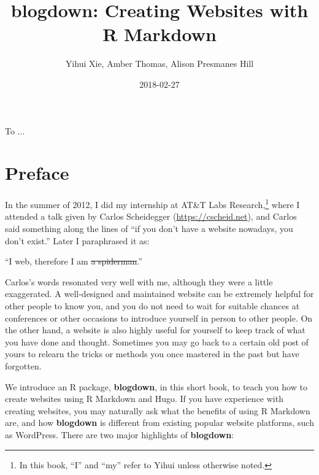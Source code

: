 \documentclass[12pt,]{krantz}
\title{blogdown: Creating Websites with R Markdown}
\author{Yihui Xie, Amber Thomas, Alison Presmanes Hill}
\date{2018-02-27}
\renewenvironment{quote}{\begin{VF}}{\end{VF}}
\theoremstyle{definition}
\theoremstyle{definition}
\theoremstyle{definition}
\theoremstyle{remark}
\begin{document}
\maketitle

\cleardoublepage\newpage\thispagestyle{empty}\null
\cleardoublepage\newpage\thispagestyle{empty}
\begin{center}
To ...
\end{center}

\setlength{\abovedisplayskip}{-5pt}
\frontmatter

{
\hypersetup{linkcolor=black}
\setcounter{tocdepth}{2}
\tableofcontents
}
\listoftables
\listoffigures
\chapter*{Preface}\label{preface}


In the summer of 2012, I did my internship at AT\&T Labs
Research,\footnote{In this book, ``I'' and ``my'' refer to Yihui unless
  otherwise noted.} where I attended a talk given by Carlos Scheidegger
(\url{https://cscheid.net}), and Carlos said something along the lines
of ``if you don't have a website nowadays, you don't exist.'' Later I
paraphrased it as:

\begin{quote}
``I web, therefore I am \sout{a spiderman}.''
\end{quote}

Carlos's words resonated very well with me, although they were a little
exaggerated. A well-designed and maintained website can be extremely
helpful for other people to know you, and you do not need to wait for
suitable chances at conferences or other occasions to introduce yourself
in person to other people. On the other hand, a website is also highly
useful for yourself to keep track of what you have done and thought.
Sometimes you may go back to a certain old post of yours to relearn the
tricks or methods you once mastered in the past but have forgotten.

We introduce an R package, \textbf{blogdown}, in this short book, to
teach you how to create websites using R Markdown and Hugo. If you have
experience with creating websites, you may naturally ask what the
benefits of using R Markdown are, and how \textbf{blogdown} is different
from existing popular website platforms, such as WordPress. There are
two major highlights of \textbf{blogdown}:
\end{document}
